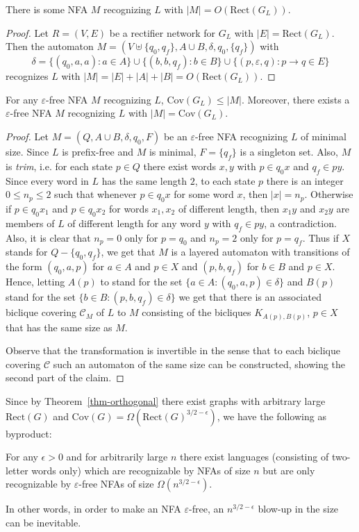 \documentclass[submission]{llncs}
\def\Cov{{\mathrm{Cov}}}
\def\Rect{{\mathrm{Rect}}}
\begin{document}
\begin{proposition}
There is some NFA $M$ recognizing $L$ with $|M|=O(\Rect(G_L))$.
\end{proposition}
\begin{proof}
Let $R=(V,E)$ be a rectifier network for $G_L$
with $|E|=\Rect(G_L)$.
Then the automaton $M=(V\uplus\{q_0,q_f\},A\cup B,\delta,q_0,\{q_f\})$ with
\[\delta=\{(q_0,a,a):a\in A\}\cup\{(b,b,q_f):b\in B\}\cup\{(p,\varepsilon,q):p\to q\in E\}\]
recognizes $L$ with $|M|=|E|+|A|+|B| = O(\Rect(G_L))$.
\end{proof}

\begin{proposition}
For any $\varepsilon$-free NFA $M$ recognizing $L$, $\Cov(G_L)\leq |M|$.
Moreover, there exists a $\varepsilon$-free NFA $M$ recognizing $L$ with $|M|=\Cov(G_L)$.
\end{proposition}
\begin{proof}
Let $M=(Q,A\cup B,\delta,q_0,F)$ be an $\varepsilon$-free NFA recognizing $L$ of minimal size.
Since $L$ is prefix-free and $M$ is minimal, $F=\{q_f\}$ is a singleton set.
Also, $M$ is \emph{trim}, i.e. for each state $p\in Q$ there exist words $x,y$ with $p\in q_0x$ and $q_f\in py$.
Since every word in $L$ has the same length $2$, to each state $p$ there is an integer $0\leq n_p\leq 2$ such that
whenever $p\in q_0x$ for some word $x$, then $|x|=n_p$. Otherwise if $p\in q_0x_1$ and $p\in q_0x_2$ for words $x_1,x_2$
of different length, then $x_1y$ and $x_2y$ are members of $L$ of different length for any word $y$ with $q_f\in py$,
a contradiction.
Also, it is clear that $n_p=0$ only for $p=q_0$ and $n_p=2$ only for $p=q_f$. Thus if $X$ stands for $Q-\{q_0,q_f\}$,
we get that $M$ is a layered automaton with transitions of the form $(q_0,a,p)$ for $a\in A$ and $p\in X$
and $(p,b,q_f)$ for $b\in B$ and $p\in X$.
Hence, letting $A(p)$ to stand for the set $\{a\in A:(q_0,a,p)\in\delta\}$ and $B(p)$ stand for the set
$\{b\in B:(p,b,q_f)\in\delta\}$ we get that there is an associated biclique covering $\mathcal{C}_M$ of $L$ to $M$
consisting of the bicliques $K_{A(p),B(p)}$, $p\in X$ that has the same size as $M$.

Observe that the transformation is invertible in the sense that to each biclique covering $\mathcal{C}$ such an
automaton of the same size can be constructed, showing the second part of the claim.
\end{proof}

Since by Theorem~\ref{thm-orthogonal} there exist graphs with arbitrary large $\Rect(G)$ and $\Cov(G)=\Omega(\Rect(G)^{3/2-\epsilon})$,
we have the following as byproduct:
\begin{theorem}
\label{thm-epsilon}
For any $\epsilon>0$ and for arbitrarily large $n$ there exist languages (consisting of two-letter words only) which are recognizable
by NFAs of size $n$ but are only recognizable by $\varepsilon$-free NFAs of size $\Omega(n^{3/2-\epsilon})$.

In other words, in order to make an NFA $\varepsilon$-free, an $n^{3/2-\epsilon}$ blow-up in the size can be inevitable.
\end{theorem}
\end{document}
